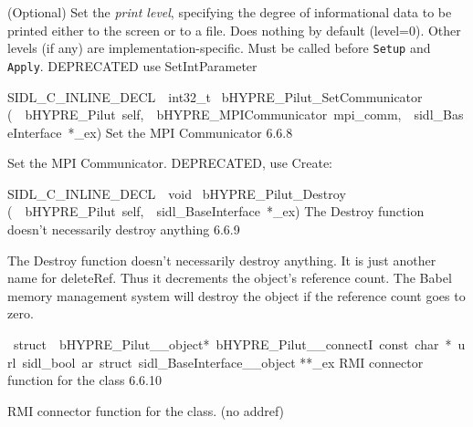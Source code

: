 \documentclass{article}
\begin{document}
\begin{cxxentry}
\begin{cxxentry}
\begin{cxxfunction}
\begin{cxxdoc}
(Optional) Set the {\it print level}, specifying the degree
of informational data to be printed either to the screen or
to a file.  Does nothing by default (level=0).  Other levels
(if any) are implementation-specific.  Must be called before
{\tt Setup} and {\tt Apply}.
DEPRECATED   use SetIntParameter
\end{cxxdoc}
\end{cxxfunction}
\begin{cxxfunction}
{SIDL\_C\_INLINE\_DECL\ \ int32\_t\ }
        {bHYPRE\_Pilut\_SetCommunicator}
        {(\ \ bHYPRE\_Pilut\ self,\ \ bHYPRE\_MPICommunicator\ mpi\_comm,\ \ sidl\_BaseInterface\ *\_ex)}
        {
Set the MPI Communicator}
        {6.6.8}
\begin{cxxdoc}

Set the MPI Communicator.
DEPRECATED, use Create:
\end{cxxdoc}
\end{cxxfunction}
\begin{cxxfunction}
{SIDL\_C\_INLINE\_DECL\ \ void\ }
        {bHYPRE\_Pilut\_Destroy}
        {(\ \ bHYPRE\_Pilut\ self,\ \ sidl\_BaseInterface\ *\_ex)}
        {
The Destroy function doesn't necessarily destroy anything}
        {6.6.9}
\begin{cxxdoc}

The Destroy function doesn't necessarily destroy anything.
It is just another name for deleteRef.  Thus it decrements the
object's reference count.  The Babel memory management system will
destroy the object if the reference count goes to zero.
\end{cxxdoc}
\end{cxxfunction}
\begin{cxxvariable}
{\ struct\ \ bHYPRE\_Pilut\_\_object*\ bHYPRE\_Pilut\_\_connectI\ const\ char\ *\ url\ sidl\_bool\ ar\ struct\ sidl\_BaseInterface\_\_object}
        {**\_ex}
        {}
        {
RMI connector function for the class}
        {6.6.10}
\begin{cxxdoc}

RMI connector function for the class. (no addref)
\end{cxxdoc}
\end{cxxvariable}
\end{cxxentry}
\end{cxxentry}
\end{document}
